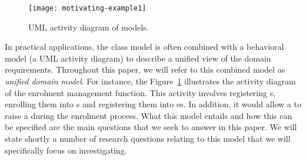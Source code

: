 
%

\begin{figure}[th]
	\begin{center}
		\texttt{[image: motivating-example1]}
	\end{center}
	\caption{UML activity diagram of \courseman models.}
	\label{fig:motivatingExample1}
\end{figure}

In practical applications, the class model is often combined with a behavioral model (\eg a UML activity diagram) to describe a unified view of the domain requirements. Throughout this paper, we will refer to this combined model as \textit{unified domain model}. For instance, the Figure~\ref{fig:motivatingExample1} illustrates the activity diagram of the enrolment management function. This activity involves registering s, enrolling them into s and registering them into es. In addition, it would allow a  to raise a  during the enrolment process.
What this model entails and how this can be specified are the main questions that we seek to answer in this paper. We will state shortly a number of research questions relating to this model that we will specifically focus on investigating.

